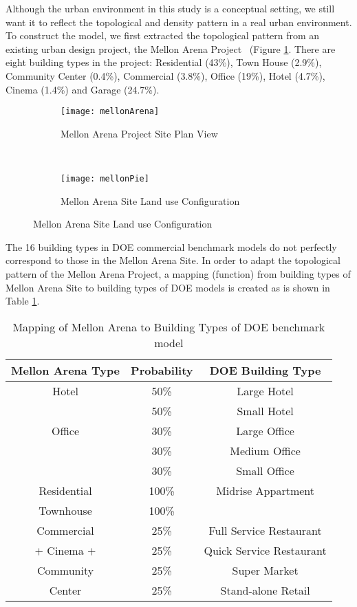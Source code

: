 \documentclass[hidelinks,12pt]{article}
\newcommand{\fref}[1]{Figure \ref{#1}}
\newcommand{\tref}[1]{Table \ref{#1}}
\begin{document}
Although the urban environment in this study is a conceptual setting,
we still want it to reflect the topological and density pattern in a
real urban environment. To construct the model, we first extracted the
topological pattern from an existing urban design project, the Mellon
Arena Project~\cite{baird2014} (\fref{fig:mellonArena}.  There are
eight building types in the project: Residential (43\%), Town House
(2.9\%), Community Center (0.4\%), Commercial (3.8\%), Office (19\%),
Hotel (4.7\%), Cinema (1.4\%) and Garage (24.7\%).
\begin{figure}[h!]
  \centering
  \begin{subfigure}
  \centering
  \texttt{[image: mellonArena]}
  \caption{Mellon Arena Project Site Plan View}
  \label{fig:mellonArena}
\end{subfigure}
~
\begin{subfigure}
  \centering
  \texttt{[image: mellonPie]}
  \caption{Mellon Arena Site Land use Configuration}
  \label{fig:mellonPie}
\end{subfigure}
\end{figure}
The 16 building types in DOE commercial benchmark models do not
perfectly correspond to those in the Mellon Arena Site. In order to
adapt the topological pattern of the Mellon Arena Project, a mapping
(function) from building types of Mellon Arena Site to building types
of DOE models is created as is shown in \tref{tab:typeMap}.
\begin{table}[h!]
  \centering
  \begin{tabular}{c| c| c}
    \hline
    Mellon Arena Type &Probability &DOE Building Type\\
    \hline
    Hotel &50\%&Large Hotel\\
    \cline{2-3}
    &50\%&Small Hotel\\
    \hline
    Office &30\%&Large Office\\
    \cline{2-3}
    &30\%&Medium Office\\
    \cline{2-3}
    &30\%&Small Office\\
    \hline
    Residential &100\%&Midrise Appartment\\
    \cline{1-2}
    Townhouse &100\%&\\
    \hline
    Commercial &25\%&Full Service Restaurant\\
    \cline{2-3}
    $+$ Cinema $+$&25\%&Quick Service Restaurant\\
    \cline{2-3}
    Community &25\%&Super Market\\
    \cline{2-3}
    Center &25\%&Stand-alone Retail\\
    \hline
  \end{tabular}
  \caption{Mapping of Mellon Arena to Building Types of DOE benchmark model}
  \label{tab:typeMap}
\end{table}
\end{document}
